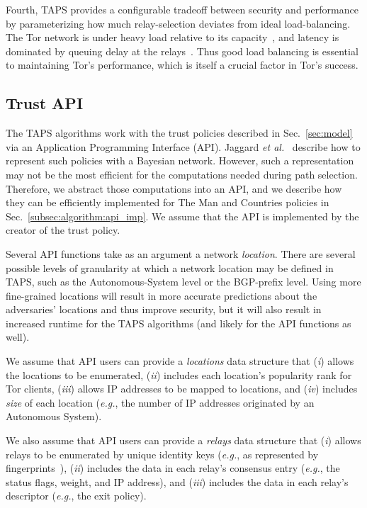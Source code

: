 \documentclass[conference]{styles/IEEEtran}
\newcommand{\etal}{\emph{et al.}}
\newcommand{\eg}{\emph{e.g.}}
\newcommand{\ps}{TAPS\xspace}
\begin{document}
Fourth, \ps provides a configurable tradeoff between security and performance by
parameterizing how much relay-selection deviates from ideal load-balancing.
The Tor network is under heavy load relative to its capacity~\cite{tormetrics}, and latency is
dominated by queuing delay at the relays~\cite{jansen2014kist}. Thus good load balancing
is essential to maintaining Tor's performance, which is itself a crucial factor in Tor's success.

\subsection{Trust API}
The \ps algorithms work with the trust policies described in Sec.~\ref{sec:model} via
an Application Programming Interface (API). Jaggard \etal~\cite{trustrep-popets14} describe how to
represent such policies
with a Bayesian network. However, such a representation may not be the most efficient for the
computations needed during path selection. Therefore, we abstract those computations into an API,
and we describe how they can be efficiently implemented for \textsf{The Man} and \textsf{Countries}
policies in Sec.~\ref{subsec:algorithm:api_imp}. We assume that the API is implemented by the
creator of the trust policy.

Several API functions take as an argument a network \emph{location}. There are
several possible levels of granularity at which a network location may be defined in \ps, such as
the Autonomous-System level or the BGP-prefix level.
Using more fine-grained locations will result in more accurate predictions
about the adversaries' locations and thus improve security, but it will also result in increased
runtime for the \ps algorithms (and likely for the API functions as well).

We assume that API users can provide a \emph{locations} data structure that (\emph{i}) allows the
locations to be enumerated, (\emph{ii})
includes each location's popularity rank for Tor clients, (\emph{iii}) allows IP addresses to be
mapped to locations, and (\emph{iv}) includes \emph{size} of each location
(\eg, the number of IP addresses originated by an Autonomous System).


We also assume that API users can provide a \emph{relays} data structure that
(\emph{i}) allows relays to be enumerated by unique identity keys (\eg, as represented by
fingerprints~\cite{dir-spec}), (\emph{ii}) includes the data in each relay's consensus entry (\eg,
the status flags, weight, and IP address), and (\emph{iii}) includes the data in each relay's
descriptor (\eg, the exit policy).
\end{document}
